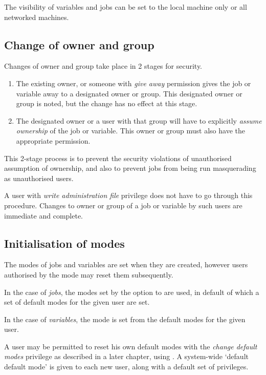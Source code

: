 The visibility of variables and jobs can be set to the local machine only or all networked \ProductName{} machines.

\subsection{Change of owner and group}
Changes of owner and group take place in 2 stages for security.

\begin{enumerate}
\item The existing owner, or someone with \textit{give away} permission gives the job or variable away to a designated owner or group. This
designated owner or group is noted, but the change has no effect at this stage.
\item The designated owner or a user with that group will have to explicitly \textit{assume ownership} of the job or variable. This owner
or group must also have the appropriate permission.
\end{enumerate}

This 2-stage process is to prevent the security violations of unauthorised assumption of ownership, and also to prevent jobs from
being run masquerading as unauthorised users.

A user with \textit{write administration file} privilege does not have to go through this procedure. Changes to owner or group of a job or
variable by such users are immediate and complete.

\subsection{Initialisation of modes}
The modes of jobs and variables are set when they are created, however users authorised by the mode may reset them subsequently.

In the case of \textit{jobs}, the modes set by the option  to \PrBtr{} are used, in
default of which a set of default modes for the given user are set.

In the case of \textit{variables}, the mode is set from the default modes for the given user.

A user may be permitted to reset his own default modes with the \textit{change default modes} privilege as described in a later
chapter, using \PrBtuser{}. A system-wide `default default mode' is given to each new user, along with a default set of privileges.

